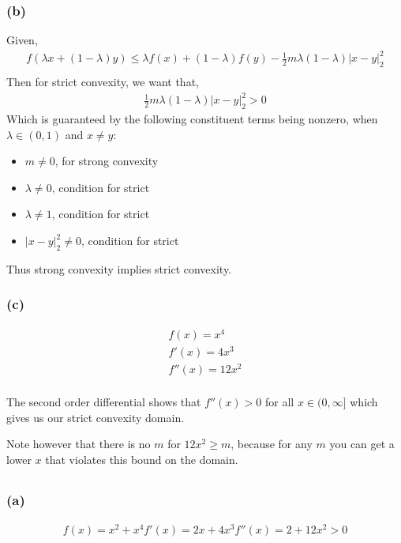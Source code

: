 \documentclass[letterpaper,10pt]{article} %
\newcommand{\lm}{\lambda}
\newcommand{\LML}[2]{\lm #1 + (1-\lm) #2}
\begin{document}
\subsubsection*{(b)}
Given,
\begin{align*}
f(\LML{x}{y}) \leq \LML{f(x)}{f(y)} - \frac{1}{2} m \lm (1 - \lm) \left|x-y\right|^2_2\\
\end{align*}
Then for strict convexity, we want that,
\begin{align*}
\frac{1}{2} m \lm (1 - \lm) \left|x-y\right|^2_2 > 0
\end{align*}
Which is guaranteed by the following constituent terms being nonzero, when $\lm \in (0,1)$ and $x\ne y$:
\begin{itemize}
\item $m\ne0$, for strong convexity
\item $\lm\ne 0$, condition for strict
\item $\lm\ne 1$, condition for strict
\item $\left|x-y\right|^2_2 \ne 0$, condition for strict
\end{itemize}

Thus strong convexity implies strict convexity.
\subsubsection*{(c)}
\begin{align*}
f(x) = x^4\\
f'(x) = 4x^3\\
f''(x) = 12x^2\\
\end{align*}

The second order differential shows that $f''(x) > 0$ for all $x \in  (0,\infty]$ which gives us our strict convexity domain.

Note however that there is no $m$ for $12x^2 \geq m$, because for any $m$ you can get a lower $x$ that violates this bound on the domain.
\subsection{}
\subsubsection*{(a)}
\begin{align*}
f(x) = x^2 + x^4
f'(x) = 2x + 4x^3
f''(x) = 2 + 12x^2 > 0
\end{align*}
\end{document}
